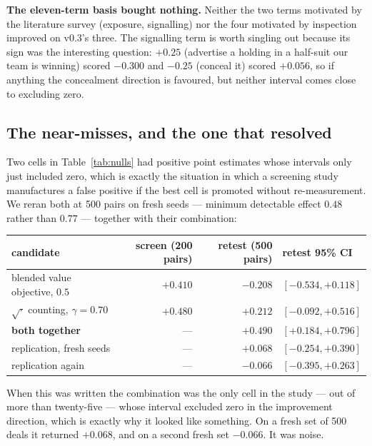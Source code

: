 \documentclass[11pt,a4paper]{article}
\begin{document}
\textbf{The eleven-term basis bought nothing.} Neither the two terms motivated
by the literature survey (exposure, signalling) nor the four motivated by
inspection improved on v0.3's three. The signalling term is worth singling out
because its sign was the interesting question: $+0.25$ (advertise a holding in a
half-suit our team is winning) scored $-0.300$ and $-0.25$ (conceal it) scored
$+0.056$, so if anything the concealment direction is favoured, but neither
interval comes close to excluding zero.

\subsection{The near-misses, and the one that resolved}
\label{sec:res-replication}

Two cells in Table~\ref{tab:nulls} had positive point estimates whose intervals
only just included zero, which is exactly the situation in which a screening
study manufactures a false positive if the best cell is promoted without
re-measurement. We reran both at 500 pairs on fresh seeds --- minimum detectable
effect $0.48$ rather than $0.77$ --- together with their combination:

\begin{center}
\small
\begin{tabular}{lrrl}
\toprule
candidate & screen (200 pairs) & retest (500 pairs) & retest 95\% CI \\
\midrule
blended value objective, $0.5$ & $+0.410$ & $-0.208$ & $[-0.534, +0.118]$ \\
$\sqrt{\cdot}$ counting, $\gamma = 0.70$ & $+0.480$ & $+0.212$ & $[-0.092, +0.516]$ \\
\textbf{both together} & --- & $\mathbf{+0.490}$ & $\mathbf{[+0.184, +0.796]}$ \\
\quad replication, fresh seeds & --- & $+0.068$ & $[-0.254, +0.390]$ \\
\quad replication again & --- & $-0.066$ & $[-0.395, +0.263]$ \\
\bottomrule
\end{tabular}
\end{center}

When this was written the combination was the only cell in the study --- out of
more than twenty-five --- whose interval excluded zero in the improvement
direction, which is exactly why it looked like something. On a fresh set of 500
deals it returned $+0.068$, and on a second fresh set $-0.066$. It was noise.
\end{document}
